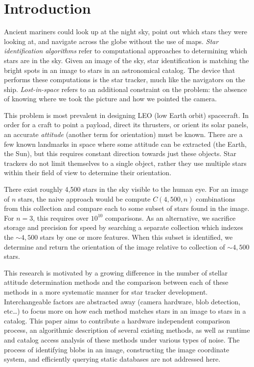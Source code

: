 \section{Introduction}\label{sec:introduction}
Ancient mariners could look up at the night sky, point out which stars they were looking at, and navigate across the
globe without the use of maps.
\textit{Star identification algorithms} refer to computational approaches to determining which stars are in the sky.
Given an image of the sky, star identification is matching the bright spots in an image to stars in an astronomical
catalog.
The device that performs these computations is the star tracker, much like the navigators on the ship.
\textit{Lost-in-space} refers to an additional constraint on the problem: the absence of knowing where we took
the picture and how we pointed the camera.

This problem is most prevalent in designing LEO (low Earth orbit) spacecraft.
In order for a craft to point a payload, direct its thrusters, or orient its solar panels, an accurate
\textit{attitude} (another term for orientation) must be known.
There are a few known landmarks in space where some attitude can be extracted (the Earth, the Sun), but this
requires constant direction towards just these objects.
Star trackers do not limit themselves to a single object, rather they use multiple stars within their field of view
to determine their orientation.

\newcommand{\seq}{\!=\!}
There exist roughly 4,500 stars in the sky visible to the human eye.
For an image of $n$ stars, the naive approach would be compute $C(4,500, n)$ combinations from this collection and
compare each to some subset of stars found in the image.
For $n\seq 3$, this requires over $10^{10}$ comparisons.
As an alternative, we sacrifice storage and precision for speed by searching a separate collection which indexes the
${\sim}4,500$ stars by one or more features.
When this subset is identified, we determine and return the orientation of the image relative to collection
of ${\sim}4,500$ stars.

This research is motivated by a growing difference in the number of stellar attitude determination methods and the
comparison between each of these methods in a more systematic manner for star tracker development.
Interchangeable factors are abstracted away (camera hardware, blob detection, etc\ldots) to focus more on how each
method matches stars in an image to stars in a catalog.
This paper aims to contribute a hardware independent comparison process, an algorithmic description of several
existing methods, as well as runtime and catalog access analysis of these methods under various types of noise.
The process of identifying blobs in an image, constructing the image coordinate system, and efficiently querying
static databases are not addressed here.
